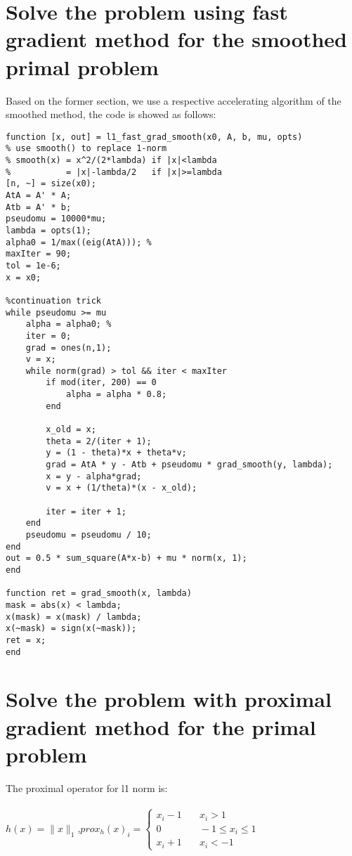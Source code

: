 \documentclass[11pt, oneside]{article}   	%
\begin{document}
\section{Solve the problem using fast gradient method for the smoothed primal problem}
Based on the former section, we use a respective accelerating algorithm of the smoothed method, the code is showed as follows:
\lstset{
 frame=single, 
breaklines=true,
language=MATLAB,
 }
\begin{lstlisting}
function [x, out] = l1_fast_grad_smooth(x0, A, b, mu, opts)
% use smooth() to replace 1-norm
% smooth(x) = x^2/(2*lambda) if |x|<lambda
%           = |x|-lambda/2   if |x|>=lambda
[n, ~] = size(x0);
AtA = A' * A;
Atb = A' * b;
pseudomu = 10000*mu;
lambda = opts(1);
alpha0 = 1/max((eig(AtA))); %
maxIter = 90;
tol = 1e-6;
x = x0;

%continuation trick
while pseudomu >= mu
    alpha = alpha0; %
    iter = 0;
    grad = ones(n,1);
    v = x;
    while norm(grad) > tol && iter < maxIter        
        if mod(iter, 200) == 0 
            alpha = alpha * 0.8; 
        end

        x_old = x;
        theta = 2/(iter + 1);
        y = (1 - theta)*x + theta*v;
        grad = AtA * y - Atb + pseudomu * grad_smooth(y, lambda);
        x = y - alpha*grad;
        v = x + (1/theta)*(x - x_old);
          
        iter = iter + 1;
    end
    pseudomu = pseudomu / 10;
end
out = 0.5 * sum_square(A*x-b) + mu * norm(x, 1);
end

function ret = grad_smooth(x, lambda)
mask = abs(x) < lambda;
x(mask) = x(mask) / lambda;
x(~mask) = sign(x(~mask));
ret = x;
end
\end{lstlisting}

\section{Solve the problem with proximal gradient method for the primal problem}
The proximal operator for l1 norm is:
\\
\\
 $h(x)=\|x\|_{1}$,\quad $prox_{h}(x)_{i}=
  \left\{
    \begin{aligned}
      x_{i}-1 &\quad x_{i}>1\\
      0 &\quad -1\leq x_{i}\leq1\\
      x_{i}+1 &\quad x_{i}<-1
    \end{aligned}
  \right.$
\\
\end{document}

